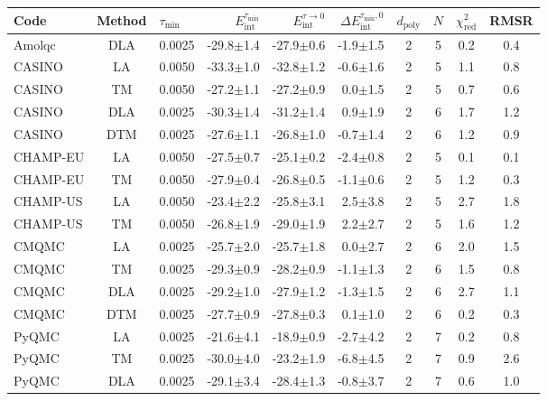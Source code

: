 \begin{tabular}{|lc|lr|r|r|cccc|}
\toprule
Code & Method & $\tau_\text{min}$ & $E_\text{int}^{\tau_\text{min}}$ & $E_\text{int}^{\tau\to 0}$ & $\Delta E_\text{int}^{\tau_\text{min},0}$ & $d_\text{poly}$ & $N$ & $\chi^2_\textrm{red}$ & RMSR \\
\midrule
Amolqc           &  DLA  & 0.0025 & -29.8$\pm$1.4 & -27.9$\pm$0.6 & -1.9$\pm$1.5 & 2 & 5 & 0.2 & 0.4 \\
CASINO           &  LA   & 0.0050 & -33.3$\pm$1.0 & -32.8$\pm$1.2 & -0.6$\pm$1.6 & 2 & 5 & 1.1 & 0.8 \\
CASINO           &  TM   & 0.0050 & -27.2$\pm$1.1 & -27.2$\pm$0.9 & 0.0$\pm$1.5 & 2 & 5 & 0.7 & 0.6 \\
CASINO           &  DLA  & 0.0025 & -30.3$\pm$1.4 & -31.2$\pm$1.4 & 0.9$\pm$1.9 & 2 & 6 & 1.7 & 1.2 \\
CASINO           &  DTM  & 0.0025 & -27.6$\pm$1.1 & -26.8$\pm$1.0 & -0.7$\pm$1.4 & 2 & 6 & 1.2 & 0.9 \\
CHAMP-EU         &  LA   & 0.0050 & -27.5$\pm$0.7 & -25.1$\pm$0.2 & -2.4$\pm$0.8 & 2 & 5 & 0.1 & 0.1 \\
CHAMP-EU         &  TM   & 0.0050 & -27.9$\pm$0.4 & -26.8$\pm$0.5 & -1.1$\pm$0.6 & 2 & 5 & 1.2 & 0.3 \\
CHAMP-US         &  LA   & 0.0050 & -23.4$\pm$2.2 & -25.8$\pm$3.1 & 2.5$\pm$3.8 & 2 & 5 & 2.7 & 1.8 \\
CHAMP-US         &  TM   & 0.0050 & -26.8$\pm$1.9 & -29.0$\pm$1.9 & 2.2$\pm$2.7 & 2 & 5 & 1.6 & 1.2 \\
CMQMC            &  LA   & 0.0025 & -25.7$\pm$2.0 & -25.7$\pm$1.8 & 0.0$\pm$2.7 & 2 & 6 & 2.0 & 1.5 \\
CMQMC            &  TM   & 0.0025 & -29.3$\pm$0.9 & -28.2$\pm$0.9 & -1.1$\pm$1.3 & 2 & 6 & 1.5 & 0.8 \\
CMQMC            &  DLA  & 0.0025 & -29.2$\pm$1.0 & -27.9$\pm$1.2 & -1.3$\pm$1.5 & 2 & 6 & 2.7 & 1.1 \\
CMQMC            &  DTM  & 0.0025 & -27.7$\pm$0.9 & -27.8$\pm$0.3 & 0.1$\pm$1.0 & 2 & 6 & 0.2 & 0.3 \\
PyQMC            &  LA   & 0.0025 & -21.6$\pm$4.1 & -18.9$\pm$0.9 & -2.7$\pm$4.2 & 2 & 7 & 0.2 & 0.8 \\
PyQMC            &  TM   & 0.0025 & -30.0$\pm$4.0 & -23.2$\pm$1.9 & -6.8$\pm$4.5 & 2 & 7 & 0.9 & 2.6 \\
PyQMC            &  DLA  & 0.0025 & -29.1$\pm$3.4 & -28.4$\pm$1.3 & -0.8$\pm$3.7 & 2 & 7 & 0.6 & 1.0 \\

\end{tabular}
